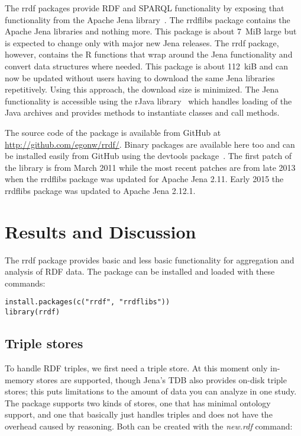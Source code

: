 \documentclass[12pt]{article}
\begin{document}
The rrdf packages provide RDF and SPARQL functionality by exposing that functionality from the
Apache Jena library~\cite{Jena}. The rrdflibs package contains the Apache Jena libraries and
nothing more. This package is about 7~MiB large but is expected to change only with major new
Jena releases. The rrdf package, however, contains the R functions that wrap around the Jena
functionality and convert data structures where needed. This package is about 112~kiB and can
now be updated without users having to download
the same Jena libraries repetitively. Using this approach, the download size is minimized.
The Jena functionality is accessible using the rJava library~\cite{RJava} which handles loading
of the Java archives and provides methods to instantiate classes and call methods.

The source code of the package is available from GitHub at \url{http://github.com/egonw/rrdf/}.
Binary packages are available here too and can be installed easily from GitHub using the 
devtools package~\cite{devtools}. The first patch of the library is from March 2011 while the
most recent patches are from late 2013 when the rrdflibs package was updated for Apache Jena 2.11.
Early 2015 the rrdflibs package was updated to Apache Jena 2.12.1.

\section{Results and Discussion}

The rrdf package provides basic and less basic functionality for aggregation and analysis of RDF data.
The package can be installed and loaded with these commands:

\begin{footnotesize}
\begin{verbatim}
install.packages(c("rrdf", "rrdflibs"))
library(rrdf)
\end{verbatim}
\end{footnotesize}

\subsection{Triple stores}

To handle RDF triples, we first need a triple store. At this moment only in-memory stores are
supported, though Jena's TDB also provides on-disk triple stores; this puts limitations to
the amount of data you can analyze in one study.
The package supports two kinds of stores, one that has minimal ontology support, and one
that basically just handles triples and does not have the overhead caused by reasoning.
Both can be created with the \textit{new.rdf} command:
\end{document}
